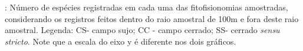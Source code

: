 \label{fig:aves3}: Número de espécies registradas em cada uma das fitofisionomias amostradas, considerando os 
registros feitos dentro do raio amostral de 100m e fora deste raio amostral. 
Legenda: CS- campo sujo; CC -  campo cerrado; SS- cerrado \textit{sensu stricto}. 
Note que a escala do eixo y é diferente nos dois gráficos.
